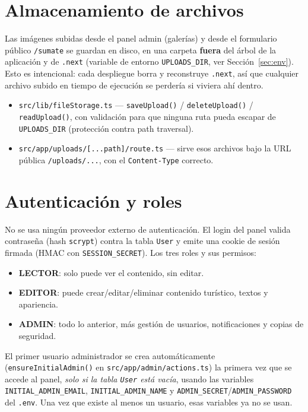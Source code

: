 \documentclass[11pt,a4paper]{article}
\begin{document}
\section{Almacenamiento de archivos}
\label{sec:storage}

Las imágenes subidas desde el panel admin (galerías) y desde el formulario público \texttt{/sumate} se guardan en disco, en una carpeta \textbf{fuera} del árbol de la aplicación y de \texttt{.next} (variable de entorno \texttt{UPLOADS\_DIR}, ver Sección~\ref{sec:env}). Esto es intencional: cada despliegue borra y reconstruye \texttt{.next}, así que cualquier archivo subido en tiempo de ejecución se perdería si viviera ahí dentro.

\begin{itemize}
  \item \texttt{src/lib/fileStorage.ts} — \texttt{saveUpload()} / \texttt{deleteUpload()} / \texttt{readUpload()}, con validación para que ninguna ruta pueda escapar de \texttt{UPLOADS\_DIR} (protección contra path traversal).
  \item \texttt{src/app/uploads/[...path]/route.ts} — sirve esos archivos bajo la URL pública \texttt{/uploads/...}, con el \texttt{Content-Type} correcto.
\end{itemize}

\section{Autenticación y roles}

No se usa ningún proveedor externo de autenticación. El login del panel valida contraseña (hash \texttt{scrypt}) contra la tabla \texttt{User} y emite una cookie de sesión firmada (HMAC con \texttt{SESSION\_SECRET}). Los tres roles y sus permisos:

\begin{itemize}
  \item \textbf{LECTOR}: solo puede ver el contenido, sin editar.
  \item \textbf{EDITOR}: puede crear/editar/eliminar contenido turístico, textos y apariencia.
  \item \textbf{ADMIN}: todo lo anterior, más gestión de usuarios, notificaciones y copias de seguridad.
\end{itemize}

\noindent El primer usuario administrador se crea automáticamente (\texttt{ensureInitialAdmin()} en \texttt{src/app/admin/actions.ts}) la primera vez que se accede al panel, \emph{solo si la tabla \texttt{User} está vacía}, usando las variables \texttt{INITIAL\_ADMIN\_EMAIL}, \texttt{INITIAL\_ADMIN\_NAME} y \texttt{ADMIN\_SECRET}/\texttt{ADMIN\_PASSWORD} del \texttt{.env}. Una vez que existe al menos un usuario, esas variables ya no se usan.
\end{document}
